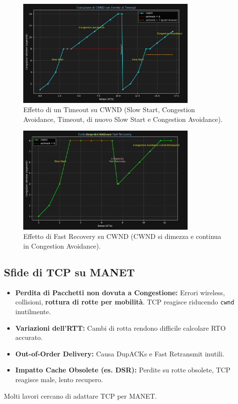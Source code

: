 \documentclass{article}
\begin{document}
\begin{figure}[H]
    \centering
    \includegraphics[width=0.8\textwidth]{images/cwnd_timeout.png}
    \caption{Effetto di un Timeout su CWND (Slow Start, Congestion Avoidance, Timeout, di nuovo Slow Start e Congestion Avoidance).}
    \label{fig:cwnd_timeout}
\end{figure}

\begin{figure}[H]
    \centering
    \includegraphics[width=0.8\textwidth]{images/cwnd_fastrecovery.png}
    \caption{Effetto di Fast Recovery su CWND (CWND si dimezza e continua in Congestion Avoidance).}
    \label{fig:cwnd_fastrecovery}
\end{figure}


\subsection{Sfide di TCP su MANET}
\begin{itemize}
    \item \textbf{Perdita di Pacchetti non dovuta a Congestione:} Errori wireless, collisioni, \textbf{rottura di rotte per mobilità}. TCP reagisce riducendo \texttt{cwnd} inutilmente.
    \item \textbf{Variazioni dell'RTT:} Cambi di rotta rendono difficile calcolare RTO accurato.
    \item \textbf{Out-of-Order Delivery:} Causa DupACKs e Fast Retransmit inutili.
    \item \textbf{Impatto Cache Obsolete (es. DSR):} Perdite su rotte obsolete, TCP reagisce male, lento recupero.
\end{itemize}
Molti lavori cercano di adattare TCP per MANET.
\end{document}
